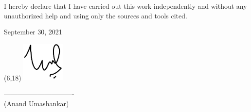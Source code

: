\vspace*{\fill}

I hereby declare that I have carried out this work independently and without any unauthorized help and using only the sources and tools cited.

\vspace*{\fill}

September 30, 2021

\vspace*{\fill}
\begin{textblock}{10}(6,18)
\raggedleft\noindent\includegraphics[height=2cm]{images/sign.pdf}
\end{textblock}
\begin{flushright}
------------------------------- \\
(Anand Umashankar)
\end{flushright}
\vspace*{\fill}
\newpage